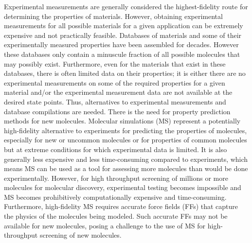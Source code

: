 \documentclass[journal=jacsat,manuscript=article]{achemso}
\begin{document}
Experimental measurements are generally considered the highest-fidelity route for determining the properties of materials. 
However, obtaining experimental measurements for all possible materials for a given application can be extremely expensive and not practically feasible. 
Databases of materials and some of their experimentally measured properties have been assembled for decades. However these databases only contain a minuscule fraction of all possible molecules that may possibly exist. Furthermore, even for the materials that exist in these databases, there is often limited data on their properties; it is either there are no experimental measurements on some of the required properties for a given material and/or the experimental measurement data are not available at the desired state points. Thus, alternatives to experimental measurements and database compilations are needed. There is the need for property prediction methods for new molecules.
Molecular simulations (MS) represent a potentially high-fidelity alternative to experiments for predicting the properties of molecules, especially for new or uncommon molecules or for properties of common molecules but at extreme conditions for which experimental data is limited. It is also generally less expensive and less time-consuming compared to experiments, which means MS can be used as a tool for assessing more molecules than would be done experimentally. However, for high throughput screening of millions or more molecules for molecular discovery, experimental testing becomes impossible and MS becomes prohibitively computationally expensive and time-consuming. Furthermore, high-fidelity MS requires accurate force fields (FFs) that capture the physics of the molecules being modeled. Such accurate FFs may not be available for new molecules, posing a challenge to the use of MS for high-throughput screening of new molecules.
\end{document}
